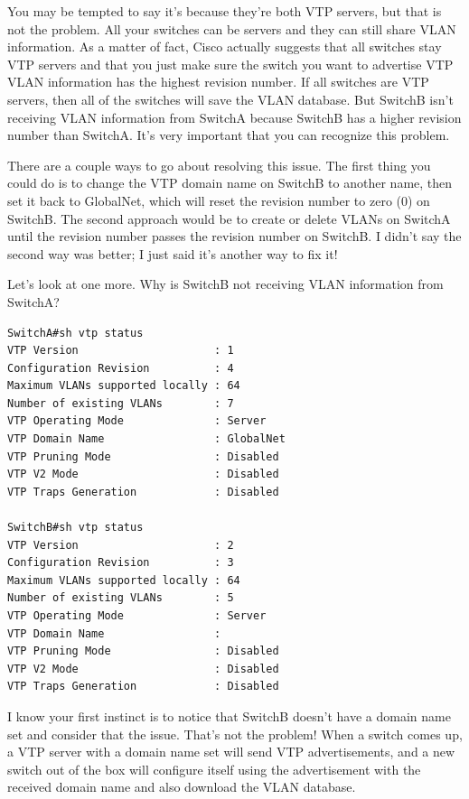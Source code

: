 You may be tempted to say it's because they're both VTP servers, but
that is not the problem. All your switches can be servers and they can
still share VLAN information. As a matter of fact, Cisco actually
suggests that all switches stay VTP servers and that you just make sure
the switch you want
to advertise VTP VLAN information has the highest revision number. If
all switches are VTP servers, then all of the switches will save the
VLAN database. But SwitchB isn't receiving VLAN information from SwitchA
because SwitchB has a higher revision number than SwitchA. It's very
important that you can recognize this problem.

There are a couple ways to go about resolving this issue. The first
thing you could do is to change the VTP domain name on SwitchB to
another name, then set it back to GlobalNet, which will reset the
revision number to zero (0) on SwitchB. The second approach would be to
create or delete VLANs on SwitchA until the revision number passes the
revision number on SwitchB. I didn't say the second way was better; I
just said it's another way to fix it!

Let's look at one more. Why is SwitchB not receiving VLAN information
from SwitchA?

\begin{verbatim}
SwitchA#sh vtp status
VTP Version                     : 1
Configuration Revision          : 4
Maximum VLANs supported locally : 64
Number of existing VLANs        : 7
VTP Operating Mode              : Server
VTP Domain Name                 : GlobalNet
VTP Pruning Mode                : Disabled
VTP V2 Mode                     : Disabled
VTP Traps Generation            : Disabled
 
SwitchB#sh vtp status
VTP Version                     : 2
Configuration Revision          : 3
Maximum VLANs supported locally : 64
Number of existing VLANs        : 5
VTP Operating Mode              : Server
VTP Domain Name                 :
VTP Pruning Mode                : Disabled
VTP V2 Mode                     : Disabled
VTP Traps Generation            : Disabled
\end{verbatim}

I know your first instinct is to notice that SwitchB doesn't have a
domain name set and consider that the issue. That's not the problem!
When a switch comes up, a VTP server with a domain name set will send
VTP advertisements, and a new switch out of the box will configure
itself using the advertisement with the received domain name and also
download the VLAN database.

